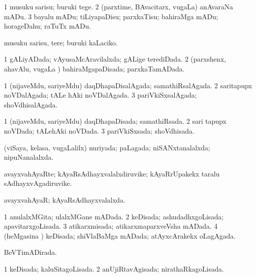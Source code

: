 \bentry
{} 
\gl{\sakirx}
\expl{}
\bmng
\bnum
\num{1} musuku sarisu; buruki tege. 
\num{2} (parxtime, BAvacitarx, \mo vugaLa) anAvaraNa mADu. 
\num{3} bayalu mADu; tiLiyapaDisu; parxkaTisu; bahiraMga mADu; horageDahu; raTuTx mADu. 
\enum
\emng

\noindent
\gl{\akirx}
\expl{}
\bmng
musuku sarisu, tere; buruki kaLaciko. 
\emng
\eentry

\bentry
{} 
\gl{\gu}
\expl{}
\bmng
\bnum
\num{1} gALiyADada; vAyusaMcAravilalxda; gALige terediDada. 
\num{2} (parxshenx, ahavAlu, \mo vugaLa \vi) bahiraMgapaDisada; parxkaTamADada. 
\enum
\emng
\eentry

\bentry
{} 
\gl{\gu}
\expl{}
\bmng
\bnum
\num{1} (nijaveMdu, sariyeMdu) daqDhapaDisalAgada; samathiRsalAgada. 
\num{2} saritapupx noVDalAgada; tALe hAki noVDalAgada. 
\num{3} pariVkiSxsalAgada; shoVdhisalAgada. 
\enum
\emng
\eentry

\bentry
{} 
\gl{\gu}
\expl{}
\bmng
\bnum
\num{1} (nijaveMdu, sariyeMdu) daqDhapaDisada; samathiRsada. 
\num{2} sari tapupx noVDada; tALehAki noVDada. 
\num{3} pariVkiSxsada; shoVdhisada. 
\enum
\emng
\eentry

\bentry
{} 
\gl{\gu}
\expl{}
\bmng
(viSaya, kelasa, \mo vugaLalilx) nuriyada; paLagada; niSANxtanalalxda; nipuNanalalxda. 
\emng
\eentry

\bentry
{} 
\gl{\nA}
\expl{}
\bmng
avayxvahAyaRte; kAyaRsAdhayxvalalxdiruvike; kAyaRrUpakekx taralu sAdhayxvAgadiruvike. 
\emng
\eentry

\bentry
{} 
\gl{\gu}
\expl{}
\bmng
avayxvahAyaR; kAyaRsAdhayxvalalxda. 
\emng
\eentry

\bentry
{} 
\gl{\gu}
\expl{}
\bmng
\bnum
\num{1} anulalxMGita; ulalxMGane mADada. 
\num{2} keDisada; ashudadhxgoLisada; apavitarxgoLisada. 
\num{3} atikarxmisada; atikarxmaparxveVsha mADada. 
\num{4} (heMgasina \vi) keDisada; shiVlaBaMga mADada; atAyxcArakekx oLagAgada. 
\enum
\emng
\eentry

\bentry
{} 
\gl{\gu}
\expl{}
\bmng
BeVTimADirada. 
\emng
\eentry

\bentry
{} 
\gl{\gu}
\expl{}
\bmng
\bnum
\num{1} keDisada; kaluSitagoLisada. 
\num{2} anUjiRtavAgisada; nirathaRkagoLisada. 
\enum
\emng
\eentry

